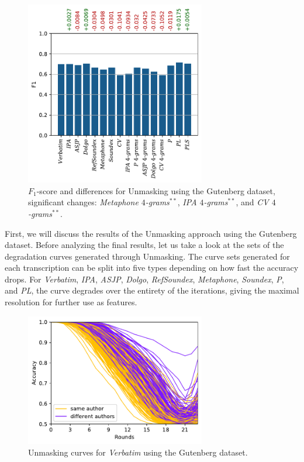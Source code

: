 \begin{figure}
  \centering
  \includegraphics[width=0.7\textwidth]{figures/results_f1_gb_unmasking}
  \caption{$F_1$-score and differences for Unmasking using the Gutenberg dataset, significant changes: \textit{Metaphone $4$-grams}$^{*\! *}$, \textit{IPA $4$-grams}$^{*\! *}$, and \textit{CV $4$-grams}$^{*\! *}$.}
  \label{fig:results_f1_gb_unmasking}
\end{figure}
First, we will discuss the results of the Unmasking approach using the Gutenberg dataset.
Before analyzing the final results, let us take a look at the sets of the degradation curves generated through Unmasking.
The curve sets generated for each transcription can be split into five types depending on how fast the accuracy drops. %
For \textit{Verbatim}, \textit{IPA}, \textit{ASJP}, \textit{Dolgo}, \textit{RefSoundex}, \textit{Metaphone}, \textit{Soundex}, \textit{P}, and \textit{PL}, the curve degrades over the entirety of the iterations, giving the maximal resolution for further use as features.
\begin{figure}
  \centering
  \includegraphics[width=0.7\textwidth]{figures/verbatim_curves}
  \caption{Unmasking curves for \textit{Verbatim} using the Gutenberg dataset.}
  \label{fig:verbatim_curves}
\end{figure}
